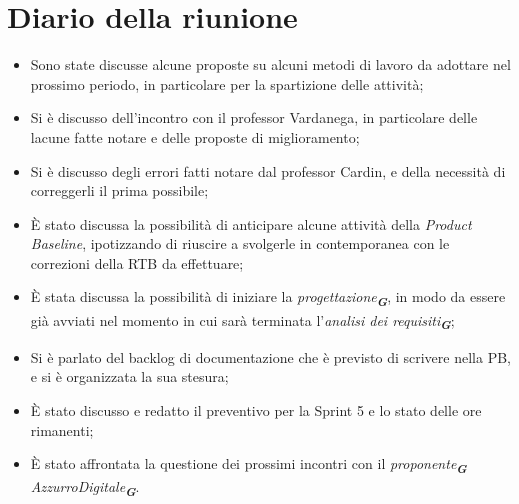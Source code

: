 
\section{Diario della riunione}

\begin{itemize}
    \item Sono state discusse alcune proposte su alcuni metodi di lavoro da adottare nel prossimo periodo, in particolare per la spartizione
    delle attività;
    \item Si è discusso dell'incontro con il professor Vardanega, in particolare delle lacune fatte notare e delle proposte di miglioramento;
    \item Si è discusso degli errori fatti notare dal professor Cardin, e della necessità di correggerli il prima possibile;
    \item È stato discussa la possibilità di anticipare alcune attività della \emph{Product Baseline}, ipotizzando di riuscire a svolgerle in contemporanea
    con le correzioni della RTB da effettuare;
    \item È stata discussa la possibilità di iniziare la \emph{progettazione}\textsubscript{\textit{\textbf{G}}}, in modo da essere già avviati nel momento in cui sarà terminata
    l'\emph{analisi dei requisiti}\textsubscript{\textit{\textbf{G}}};
    \item Si è parlato del backlog di documentazione che è previsto di scrivere nella PB, e si è organizzata la sua stesura;
    \item È stato discusso e redatto il preventivo per la Sprint 5 e lo stato delle ore rimanenti;
    \item È stato affrontata la questione dei prossimi incontri con il \emph{proponente}\textsubscript{\textit{\textbf{G}}} \emph{AzzurroDigitale}\textsubscript{\textit{\textbf{G}}}.
 \end{itemize}
